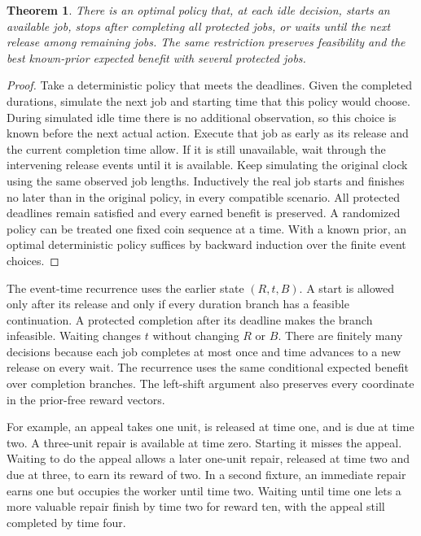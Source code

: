 \documentclass[11pt]{article}
\newtheorem{theorem}{Theorem}
\begin{document}
\begin{theorem}
There is an optimal policy that, at each idle decision, starts an
available job, stops after completing all protected jobs, or waits
until the next release among remaining jobs. The same restriction
preserves feasibility and the best known-prior expected benefit
with several protected jobs.
\end{theorem}
\begin{proof}
Take a deterministic policy that meets the deadlines. Given the
completed durations, simulate the next job and starting time that
this policy would choose. During simulated idle time there is no
additional observation, so this choice is known before the next
actual action. Execute that job as early as its release and the
current completion time allow. If it is still unavailable, wait
through the intervening release events until it is available.
Keep simulating the original clock using the same observed job
lengths. Inductively the real job starts and finishes no later
than in the original policy, in every compatible scenario.
All protected deadlines remain satisfied and every earned benefit
is preserved. A randomized policy can be treated one fixed coin
sequence at a time. With a known prior, an optimal deterministic
policy suffices by backward induction over the finite event choices.
\end{proof}

The event-time recurrence uses the earlier state $(R,t,B)$. A
start is allowed only after its release and only if every duration
branch has a feasible continuation. A protected completion after
its deadline makes the branch infeasible. Waiting changes $t$
without changing $R$ or $B$. There are finitely many decisions
because each job completes at most once and time advances to a
new release on every wait. The recurrence uses the same conditional
expected benefit over completion branches. The left-shift argument
also preserves every coordinate in the prior-free reward vectors.

For example, an appeal takes one unit, is released at time one,
and is due at time two. A three-unit repair is available at time
zero. Starting it misses the appeal. Waiting to do the appeal
allows a later one-unit repair, released at time two and due at
three, to earn its reward of two. In a second fixture, an immediate
repair earns one but occupies the worker until time two. Waiting
until time one lets a more valuable repair finish by time two for
reward ten, with the appeal still completed by time four.
\end{document}

